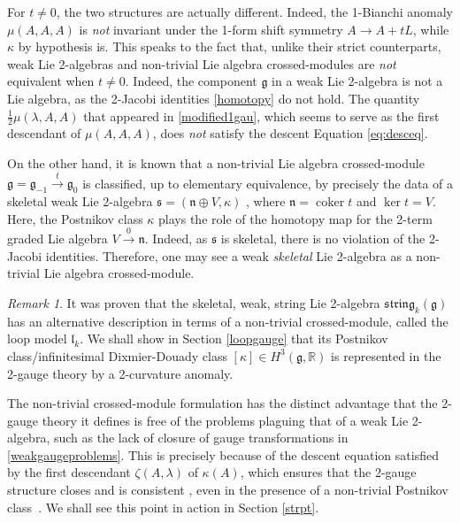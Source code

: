 \documentclass[onecolumn]{article}
\theoremstyle{theorem}
\theoremstyle{remark}
\newtheorem{remark}{Remark}[section]
\theoremstyle{example}
\theoremstyle{definition}
\numberwithin{equation}{section}
\def\s{\mathfrak s}
\def\g{\mathfrak g}
\def\R{\mathbb{R}}
\begin{document}
For $t\neq 0$, the two structures are actually different. Indeed,  the 1-Bianchi anomaly $\mu(A,A,A)$ is {\it {not}} invariant under the 1-form shift symmetry $A\rightarrow A+tL$, while $\kappa$ by hypothesis is. This speaks to the fact that, unlike their strict counterparts, weak Lie 2-algebras and non-trivial Lie algebra crossed-modules are \textit{{not}} equivalent when $t\neq 0$. Indeed, the component $\g$ in a weak Lie 2-algebra is not a Lie algebra, as the 2-Jacobi identities \eqref{homotopy} do not hold. The quantity $\frac{1}{2}\mu(\lambda,A,A)$ that appeared in  \eqref{modified1gau}, which seems to serve as the first descendant of $\mu(A,A,A)$, does {\it {not}} satisfy the descent Equation \eqref{eq:desceq}.

On the other hand, it is known that a non-trivial Lie algebra crossed-module $\g=\g_{-1}\xrightarrow{t}\g_0$ is classified, up to elementary equivalence, by precisely the data of a skeletal weak Lie 2-algebra $\s=(\mathfrak{n}\oplus V,\kappa)$ \cite{Baez:2003fs,Baez:2005sn}, where $\mathfrak{n}=\operatorname{coker}t$ and $\operatorname{ker}t=V$. Here, the Postnikov class $\kappa$ plays the role of the homotopy map for the 2-term graded Lie algebra $V\xrightarrow{0}\mathfrak{n}$. Indeed, as $\s$ is skeletal, there is no violation of the 2-Jacobi identities. Therefore, one may see a weak {\it {skeletal}} Lie 2-algebra as a non-trivial Lie algebra crossed-module.

\begin{remark}\label{postweak}
It was proven \cite{Baez:2005sn} that the skeletal, weak, string Lie 2-algebra $\mathfrak{string}_k(\mathfrak{g})$ has an alternative description in terms of a non-trivial crossed-module, called the loop model $\mathfrak{l}_k$. We shall show in Section \ref{loopgauge} that its Postnikov class/infinitesimal Dixmier-Douady class $[\kappa]\in  H^3(\g,\R)$ is represented in the 2-gauge theory by a 2-curvature anomaly.
\end{remark}

The non-trivial crossed-module formulation has the distinct advantage that the 2-gauge theory it defines is free of the problems plaguing that of a weak Lie 2-algebra, such as the lack of closure of gauge transformations in  \eqref{weakgaugeproblems}. This is precisely because of the descent equation satisfied by the first descendant $\zeta(A,\lambda)$ of $\kappa(A)$, which ensures that the 2-gauge structure closes and is consistent \cite{Kim:2019owc}, even in the presence of a non-trivial Postnikov class~\cite{Kapustin:2013uxa}. We shall see this point in action in Section \ref{strpt}.
\end{document}
